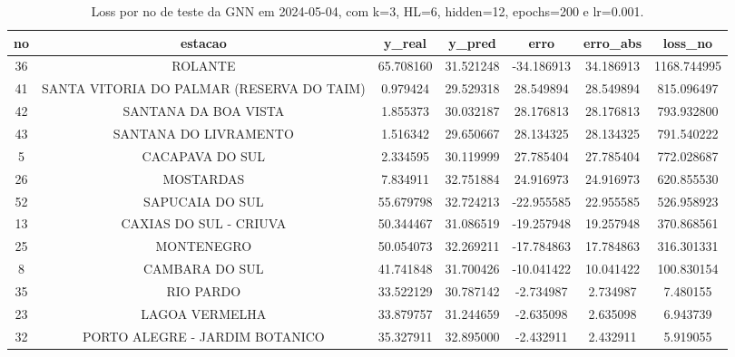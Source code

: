 \begin{table}[h]
\centering
\caption{Loss por no de teste da GNN em 2024-05-04, com k=3, HL=6, hidden=12, epochs=200 e lr=0.001.}
\label{tab:gnn_loss_k3_hl6_h12_e200_d20240504}
\begin{tabular}{ccccccc}
\toprule
no & estacao & y\_real & y\_pred & erro & erro\_abs & loss\_no \\
\midrule
36 & ROLANTE & 65.708160 & 31.521248 & -34.186913 & 34.186913 & 1168.744995 \\
41 & SANTA VITORIA DO PALMAR (RESERVA DO TAIM) & 0.979424 & 29.529318 & 28.549894 & 28.549894 & 815.096497 \\
42 & SANTANA DA BOA VISTA & 1.855373 & 30.032187 & 28.176813 & 28.176813 & 793.932800 \\
43 & SANTANA DO LIVRAMENTO & 1.516342 & 29.650667 & 28.134325 & 28.134325 & 791.540222 \\
5 & CACAPAVA DO SUL & 2.334595 & 30.119999 & 27.785404 & 27.785404 & 772.028687 \\
26 & MOSTARDAS & 7.834911 & 32.751884 & 24.916973 & 24.916973 & 620.855530 \\
52 & SAPUCAIA DO SUL & 55.679798 & 32.724213 & -22.955585 & 22.955585 & 526.958923 \\
13 & CAXIAS DO SUL - CRIUVA & 50.344467 & 31.086519 & -19.257948 & 19.257948 & 370.868561 \\
25 & MONTENEGRO & 50.054073 & 32.269211 & -17.784863 & 17.784863 & 316.301331 \\
8 & CAMBARA DO SUL & 41.741848 & 31.700426 & -10.041422 & 10.041422 & 100.830154 \\
35 & RIO PARDO & 33.522129 & 30.787142 & -2.734987 & 2.734987 & 7.480155 \\
23 & LAGOA VERMELHA & 33.879757 & 31.244659 & -2.635098 & 2.635098 & 6.943739 \\
32 & PORTO ALEGRE - JARDIM BOTANICO & 35.327911 & 32.895000 & -2.432911 & 2.432911 & 5.919055 \\
\bottomrule
\end{tabular}
\end{table}
